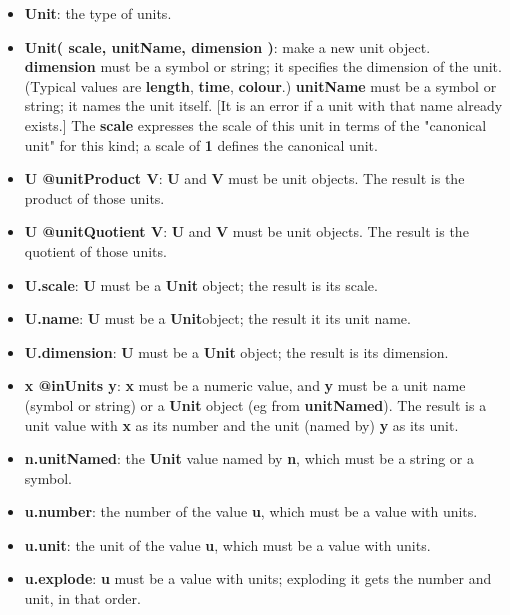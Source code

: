 \documentclass{report}
\begin{document}
\begin{itemize}\item {\bf Unit}: the type of units.

\item {\bf Unit( scale, unitName, dimension )}: make a new unit object. {\bf dimension} must
be a symbol or string; it specifies the dimension of the unit. (Typical values
are {\bf length}, {\bf time}, {\bf colour}.) {\bf unitName} must be a symbol or string; it
names the unit itself. {[}It is an error if a unit with that name already
exists.{]} The {\bf scale} expresses the scale of this unit in terms of the
"canonical unit" for this kind; a scale of {\bf 1} defines the canonical unit.

\item {\bf U @unitProduct V}: {\bf U} and {\bf V} must be unit objects. The result is the
product of those units.

\item {\bf U @unitQuotient V}: {\bf U} and {\bf V} must be unit objects. The result is the
quotient of those units.

\item {\bf U.scale}: {\bf U} must be a {\bf Unit} object; the result is its scale.

\item {\bf U.name}: {\bf U} must be a {\bf Unit}object; the result it its unit name.

\item {\bf U.dimension}: {\bf U} must be a {\bf Unit} object; the result is its dimension.

\item {\bf x @inUnits y}: {\bf x} must be a numeric value, and {\bf y} must be a unit name
(symbol or string) or a {\bf Unit} object (eg from {\bf unitNamed}). The result is a
unit value with {\bf x} as its number and the unit (named by) {\bf y} as its unit.

\item {\bf n.unitNamed}: the {\bf Unit} value named by {\bf n}, which must be a string or a
symbol.

\item {\bf u.number}: the number of the value {\bf u}, which must be a value with
units.

\item {\bf u.unit}: the unit of the value {\bf u}, which must be a value with units.

\item {\bf u.explode}: {\bf u} must be a value with units; exploding it gets the number
and unit, in that order.

\end{itemize}
\end{document}
